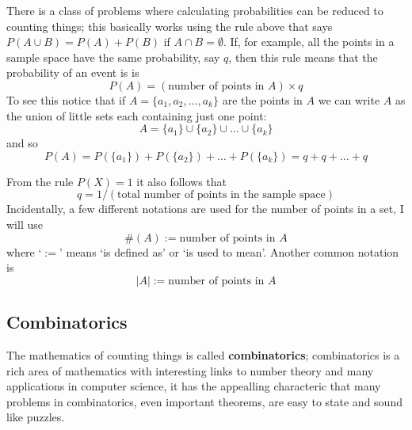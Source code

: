 \documentclass[11pt,a4paper]{scrartcl}
\begin{document}
There is a class of problems where calculating probabilities can be
reduced to counting things; this basically works using the rule above
that says $P(A\cup B)=P(A)+P(B)$ if $A\cap B=\emptyset$. If, for
example, all the points in a sample space have the same probability,
say $q$, then this rule means that the probability of an event is is
\begin{equation}
P(A)=(\mbox{number of points in }A)\times q
\end{equation}
To see this notice that if $A=\{a_1,a_2,\ldots,a_k\}$ are the points in $A$ we can write $A$ as the union of little sets each containing just one point:
\begin{equation}
A=\{a_1\}\cup\{a_2\}\cup\ldots\cup\{a_k\}
\end{equation}
and so
\begin{equation}
P(A)=P(\{a_1\})+P(\{a_2\})+\ldots+P(\{a_k\})=q+q+\ldots+q
\end{equation}

From the rule $P(X)=1$ it also follows that 
\begin{equation}
q=1/(\mbox{total number of points in the sample space})
\end{equation}
Incidentally, a few different notations are used for the number of points in a set, I will use
\begin{equation}
\#(A):=\mbox{number of points in }A
\end{equation}
where \lq{}$:=$\rq{} means \lq{}is defined as\rq{} or \lq{}is used to
mean\rq{}. Another common notation is
\begin{equation}
|A|:=\mbox{number of points in }A
\end{equation}

\subsection*{Combinatorics}

The mathematics of counting things is called \textbf{combinatorics};
combinatorics is a rich area of mathematics with interesting links to
number theory and many applications in computer science, it has the
appealling characteric that many problems in combinatorics, even
important theorems, are easy to state and sound like puzzles.
\end{document}
